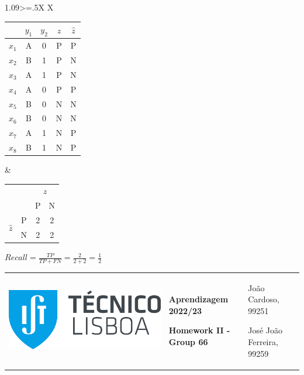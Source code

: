 \documentclass[11pt,a4paper]{article}
\begin{document}
\begin{flushleft}
  \vspace{5mm}
  \begin{tabularx}{1.09\textwidth}{>{\hsize=.5\hsize}X X}
    \begin{tabular}{c|cc|c|c}
            & $y_1$ & $y_2$ & $z$ & $\hat{z}$ \\ \hline
      $x_1$ & A     & 0     & P   & P         \\
      $x_2$ & B     & 1     & P   & N         \\
      $x_3$ & A     & 1     & P   & N         \\
      $x_4$ & A     & 0     & P   & P         \\ \hline
      $x_5$ & B     & 0     & N   & N         \\
      $x_6$ & B     & 0     & N   & N         \\
      $x_7$ & A     & 1     & N   & P         \\
      $x_8$ & B     & 1     & N   & P
    \end{tabular}
     &
    \vspace{10mm}\begin{tabular}{llcc}
                                                                  &                        & \multicolumn{2}{c}{$z$}     \\
                                                                  & \multicolumn{1}{l|}{}  & \multicolumn{1}{c|}{P}  & N \\ \cline{2-4}
                   \multicolumn{1}{c}{\multirow{2}{*}{$\hat{z}$}} & \multicolumn{1}{c|}{P} & \multicolumn{1}{c|}{2}  & 2 \\ \cline{2-4}
                   \multicolumn{1}{c}{}                           & \multicolumn{1}{c|}{N} & \multicolumn{1}{c|}{2}  & 2
                 \end{tabular} \par
    \vspace{5mm} $ Recall = \frac{TP}{TP + FN} = \frac{2}{2 + 2} = \frac{1}{2} $
  \end{tabularx}
\end{flushleft}
\normalsize

\pagebreak
\color{darkgray}
\hspace{-8.25mm}
\begin{tabularx}{1.09\textwidth} {>{\raggedright\arraybackslash}X >{\centering\arraybackslash}X >{\raggedleft\arraybackslash}X}
  \includegraphics[scale=0.2]{tecnico.pdf}                           &
  \textbf{Aprendizagem 2022/23} \par \textbf{Homework II - Group 66} &
  João Cardoso, 99251 \par José João Ferreira, 99259
\end{tabularx}
\color{black}
\end{document}
